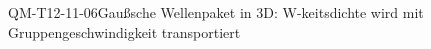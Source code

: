 
\begin{EXA}{QM-T12-11-06}{Gaußsche Wellenpaket in 3D: W-keitsdichte wird mit Gruppengeschwindigkeit transportiert}
\end{EXA}
